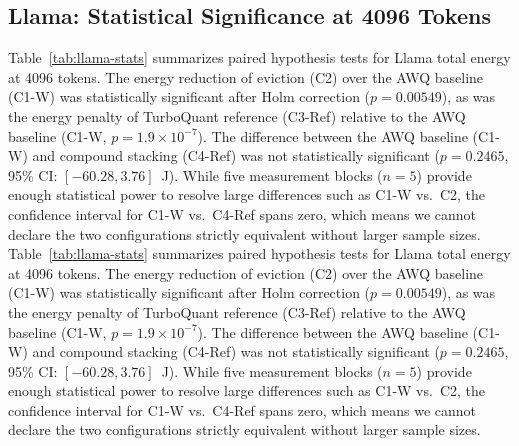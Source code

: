 \documentclass[sigconf,nonacm]{acmart}
\begin{document}
\subsection{Llama: Statistical Significance at 4096 Tokens}

Table~\ref{tab:llama-stats} summarizes paired hypothesis tests for Llama total energy at 4096 tokens. The energy reduction of eviction (C2) over the AWQ baseline (C1-W) was statistically significant after Holm correction ($p = 0.00549$), as was the energy penalty of TurboQuant reference (C3-Ref) relative to the AWQ baseline (C1-W, $p = 1.9 \times 10^{-7}$). The difference between the AWQ baseline (C1-W) and compound stacking (C4-Ref) was not statistically significant ($p = 0.2465$, 95\% CI: $[-60.28, 3.76]$~J). While five measurement blocks ($n=5$) provide enough statistical power to resolve large differences such as C1-W vs.\ C2, the confidence interval for C1-W vs.\ C4-Ref spans zero, which means we cannot declare the two configurations strictly equivalent without larger sample sizes.
Table~\ref{tab:llama-stats} summarizes paired hypothesis tests for Llama total energy at 4096 tokens. The energy reduction of eviction (C2) over the AWQ baseline (C1-W) was statistically significant after Holm correction ($p = 0.00549$), as was the energy penalty of TurboQuant reference (C3-Ref) relative to the AWQ baseline (C1-W, $p = 1.9 \times 10^{-7}$). The difference between the AWQ baseline (C1-W) and compound stacking (C4-Ref) was not statistically significant ($p = 0.2465$, 95\% CI: $[-60.28, 3.76]$~J). While five measurement blocks ($n=5$) provide enough statistical power to resolve large differences such as C1-W vs.\ C2, the confidence interval for C1-W vs.\ C4-Ref spans zero, which means we cannot declare the two configurations strictly equivalent without larger sample sizes.
\end{document}
